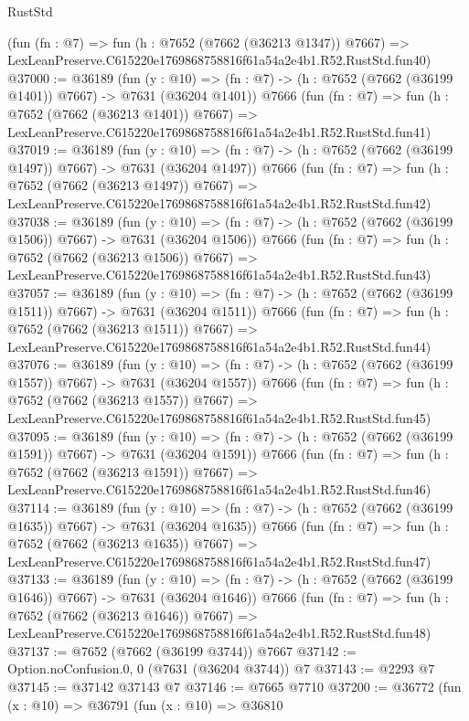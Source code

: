 \begin{lexlean}{RustStd}
\begin{coremodule}
    (fun (fn : @7) =>
    fun (h : @7652 (@7662 (@36213 @1347)) @7667) =>
    LexLeanPreserve.C615220e1769868758816f61a54a2e4b1.R52.RustStd.fun40)
@37000 := @36189
    (fun (y : @10) => (fn : @7) -> (h : @7652 (@7662 (@36199 @1401)) @7667) -> @7631 (@36204 @1401))
    @7666
    (fun (fn : @7) =>
    fun (h : @7652 (@7662 (@36213 @1401)) @7667) =>
    LexLeanPreserve.C615220e1769868758816f61a54a2e4b1.R52.RustStd.fun41)
@37019 := @36189
    (fun (y : @10) => (fn : @7) -> (h : @7652 (@7662 (@36199 @1497)) @7667) -> @7631 (@36204 @1497))
    @7666
    (fun (fn : @7) =>
    fun (h : @7652 (@7662 (@36213 @1497)) @7667) =>
    LexLeanPreserve.C615220e1769868758816f61a54a2e4b1.R52.RustStd.fun42)
@37038 := @36189
    (fun (y : @10) => (fn : @7) -> (h : @7652 (@7662 (@36199 @1506)) @7667) -> @7631 (@36204 @1506))
    @7666
    (fun (fn : @7) =>
    fun (h : @7652 (@7662 (@36213 @1506)) @7667) =>
    LexLeanPreserve.C615220e1769868758816f61a54a2e4b1.R52.RustStd.fun43)
@37057 := @36189
    (fun (y : @10) => (fn : @7) -> (h : @7652 (@7662 (@36199 @1511)) @7667) -> @7631 (@36204 @1511))
    @7666
    (fun (fn : @7) =>
    fun (h : @7652 (@7662 (@36213 @1511)) @7667) =>
    LexLeanPreserve.C615220e1769868758816f61a54a2e4b1.R52.RustStd.fun44)
@37076 := @36189
    (fun (y : @10) => (fn : @7) -> (h : @7652 (@7662 (@36199 @1557)) @7667) -> @7631 (@36204 @1557))
    @7666
    (fun (fn : @7) =>
    fun (h : @7652 (@7662 (@36213 @1557)) @7667) =>
    LexLeanPreserve.C615220e1769868758816f61a54a2e4b1.R52.RustStd.fun45)
@37095 := @36189
    (fun (y : @10) => (fn : @7) -> (h : @7652 (@7662 (@36199 @1591)) @7667) -> @7631 (@36204 @1591))
    @7666
    (fun (fn : @7) =>
    fun (h : @7652 (@7662 (@36213 @1591)) @7667) =>
    LexLeanPreserve.C615220e1769868758816f61a54a2e4b1.R52.RustStd.fun46)
@37114 := @36189
    (fun (y : @10) => (fn : @7) -> (h : @7652 (@7662 (@36199 @1635)) @7667) -> @7631 (@36204 @1635))
    @7666
    (fun (fn : @7) =>
    fun (h : @7652 (@7662 (@36213 @1635)) @7667) =>
    LexLeanPreserve.C615220e1769868758816f61a54a2e4b1.R52.RustStd.fun47)
@37133 := @36189
    (fun (y : @10) => (fn : @7) -> (h : @7652 (@7662 (@36199 @1646)) @7667) -> @7631 (@36204 @1646))
    @7666
    (fun (fn : @7) =>
    fun (h : @7652 (@7662 (@36213 @1646)) @7667) =>
    LexLeanPreserve.C615220e1769868758816f61a54a2e4b1.R52.RustStd.fun48)
@37137 := @7652 (@7662 (@36199 @3744)) @7667
@37142 := Option.noConfusion.{0, 0} (@7631 (@36204 @3744)) @7
@37143 := @2293 @7
@37145 := @37142 @37143 @7
@37146 := @7665 @7710
@37200 := @36772
    (fun (x : @10) =>
    @36791
      (fun (x : @10) =>
      @36810

\end{coremodule}
\end{lexlean}
